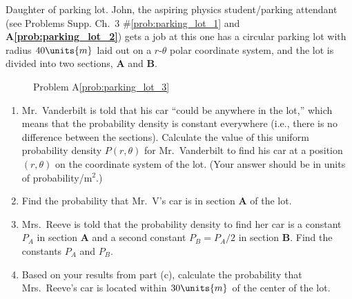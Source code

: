 \begin{aproblem}{Daughter of parking lot.}  
  John, the aspiring physics student/parking attendant (see Problems
  Supp. Ch.~3 \#\ref{prob:parking_lot_1} and {\bf
    A\ref{prob:parking_lot_2}}) gets a job at %
  this one has a circular parking lot with radius $40\units{m}$ laid
  out on a $r$-$\theta$ polar coordinate system, and the lot is
  divided into two sections, {\bf A} and {\bf B}.
  \label{prob:parking_lot_3}
  \begin{figure}[h]
    \begin{center}
      \caption{Problem A\ref{prob:parking_lot_3}}
    \end{center}
  \end{figure}

  \begin{enumerate}
  \item Mr.~Vanderbilt is told that his car ``could be anywhere in the
    lot,'' which means that the probability density is constant
    everywhere (i.e., there is no difference between the sections).
    Calculate the value of this uniform probability density
    $P(r,\theta)$ for Mr.~Vanderbilt to find his car at a position
    $(r,\theta)$ on the coordinate system of the lot.  (Your answer
    should be in units of probability/m$^2$.)
  \item Find the probability that Mr.~V's car is in section {\bf A} of
    the lot.
  \item Mrs.~Reeve is told that the probability density to find her
    car is a constant $P_A$ in section {\bf A} and a second constant
    $P_B = P_A/2$ in section {\bf B}.  Find the constants $P_A$ and
    $P_B$.
  \item Based on your results from part (c), calculate the probability
    that Mrs.~Reeve's car is located within $30\units{m}$ of the
    center of the lot.
  \end{enumerate}
\end{aproblem}


